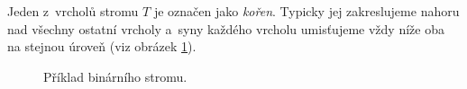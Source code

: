 Jeden z~vrcholů stromu $T$ je označen jako \emph{kořen}. Typicky jej zakreslujeme nahoru nad všechny ostatní vrcholy a~syny každého vrcholu umisťujeme vždy níže oba na stejnou úroveň (viz obrázek \ref{fig:binarni_strom_priklad}).

\begin{figure}[ht]
    \centering
    
    \caption{Příklad binárního stromu.}
    \label{fig:binarni_strom_priklad}    
\end{figure}
